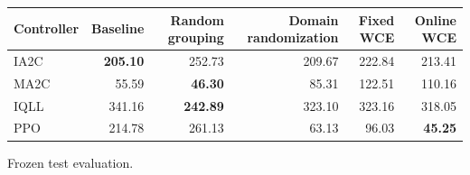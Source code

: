 \begin{tabular}{lrrrrr}
\hline
Controller & Baseline & Random grouping & Domain randomization & Fixed WCE & Online WCE \\
\hline
IA2C & \textbf{205.10} & 252.73 & 209.67 & 222.84 & 213.41 \\
MA2C & 55.59 & \textbf{46.30} & 85.31 & 122.51 & 110.16 \\
IQLL & 341.16 & \textbf{242.89} & 323.10 & 323.16 & 318.05 \\
PPO & 214.78 & 261.13 & 63.13 & 96.03 & \textbf{45.25} \\
\hline
\end{tabular}
Frozen test evaluation.
